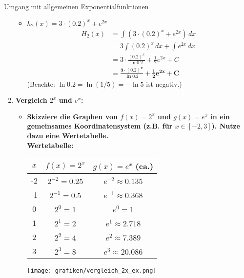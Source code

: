 \begin{loesungsumgebung}{Umgang mit allgemeinen Exponentialfunktionen}
\begin{enumerate}[label=(\alph*)]
\begin{itemize}
        \item \textbf{$h_2(x) = 3 \cdot (0.2)^x + e^{2x}$}
        \begin{align*} H_2(x) &= \int (3 \cdot (0.2)^x + e^{2x}) \,dx \\ &= 3 \int (0.2)^x \,dx + \int e^{2x} \,dx \\ &= 3 \cdot \frac{(0.2)^x}{\ln 0.2} + \frac{1}{2}e^{2x} + C \\ &= \mathbf{\frac{3 \cdot (0.2)^x}{\ln 0.2} + \frac{1}{2}e^{2x} + C} \end{align*}
        (Beachte: $\ln 0.2 = \ln(1/5) = -\ln 5$ ist negativ.)
    \end{itemize}

    \item \textbf{Vergleich $2^x$ und $e^x$:}
    \begin{itemize}
        \item \textbf{Skizziere die Graphen von $f(x)=2^x$ und $g(x)=e^x$ in ein gemeinsames Koordinatensystem (z.B. für $x \in [-2, 3]$). Nutze dazu eine Wertetabelle.} \\
        \textbf{Wertetabelle:}
        \begin{center}
        \begin{tabular}{c|c|c}
        $x$ & $f(x)=2^x$ & $g(x)=e^x$ (ca.) \\
        \hline
        -2 & $2^{-2} = 0.25$ & $e^{-2} \approx 0.135$ \\
        -1 & $2^{-1} = 0.5$ & $e^{-1} \approx 0.368$ \\
        0 & $2^0 = 1$ & $e^0 = 1$ \\
        1 & $2^1 = 2$ & $e^1 \approx 2.718$ \\
        2 & $2^2 = 4$ & $e^2 \approx 7.389$ \\
        3 & $2^3 = 8$ & $e^3 \approx 20.086$ \\
        \end{tabular}
        \end{center}
        \begin{center}
        \texttt{[image: grafiken/vergleich\_2x\_ex.png]}
        \label{fig:vergleich_2x_ex}
        \end{center}


\end{itemize}
\end{enumerate}
\end{loesungsumgebung}
